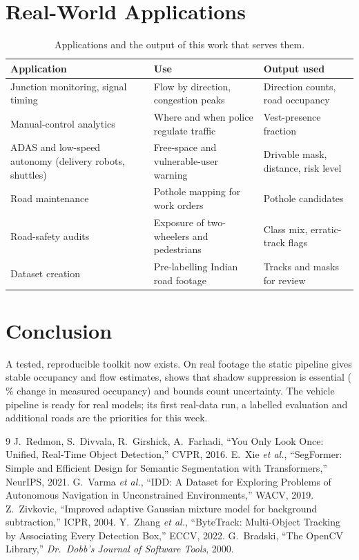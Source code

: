 \documentclass[11pt,a4paper]{article}
\newcommand{\pct}[1]{#1\,\%}
\begin{document}
\section{Real-World Applications}
\begin{table}[H]
\centering
\caption{Applications and the output of this work that serves them.}
\small
\begin{tabular}{@{}p{4.4cm}p{6.0cm}p{5.0cm}@{}}
\toprule
Application & Use & Output used \\
\midrule
Junction monitoring, signal timing & Flow by direction, congestion peaks & Direction counts, road occupancy \\
Manual-control analytics & Where and when police regulate traffic & Vest-presence fraction \\
ADAS and low-speed autonomy (delivery robots, shuttles) & Free-space and vulnerable-user warning & Drivable mask, distance, risk level \\
Road maintenance & Pothole mapping for work orders & Pothole candidates \\
Road-safety audits & Exposure of two-wheelers and pedestrians & Class mix, erratic-track flags \\
Dataset creation & Pre-labelling Indian road footage & Tracks and masks for review \\
\bottomrule
\end{tabular}
\end{table}

\section{Conclusion}
A tested, reproducible toolkit now exists. On real footage the static pipeline gives stable occupancy and flow estimates, shows that shadow suppression is essential
(\pct{\mShadowGainRel} change in measured occupancy) and bounds count uncertainty. The vehicle pipeline is ready for real models; its first real-data run, a labelled
evaluation and additional roads are the priorities for this week.

\begin{thebibliography}{9}
 J.~Redmon, S.~Divvala, R.~Girshick, A.~Farhadi, ``You Only Look Once: Unified, Real-Time Object Detection,'' CVPR, 2016.
 E.~Xie \emph{et al.}, ``SegFormer: Simple and Efficient Design for Semantic Segmentation with Transformers,'' NeurIPS, 2021.
 G.~Varma \emph{et al.}, ``IDD: A Dataset for Exploring Problems of Autonomous Navigation in Unconstrained Environments,'' WACV, 2019.
 Z.~Zivkovic, ``Improved adaptive Gaussian mixture model for background subtraction,'' ICPR, 2004.
 Y.~Zhang \emph{et al.}, ``ByteTrack: Multi-Object Tracking by Associating Every Detection Box,'' ECCV, 2022.
 G.~Bradski, ``The OpenCV Library,'' \emph{Dr.\ Dobb's Journal of Software Tools}, 2000.
\end{thebibliography}
\end{document}
